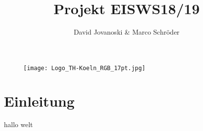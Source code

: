 \documentclass[10pt,a4paper]{article}
\title{Projekt EISWS18/19}
\author{David Jovanoski & Marco Schröder}
\begin{document}
\begin{figure}
\texttt{[image: Logo\_TH-Koeln\_RGB\_17pt.jpg]} 
\end{figure}
 \maketitle
\tableofcontents
\section{Einleitung}
hallo welt
\end{document}
